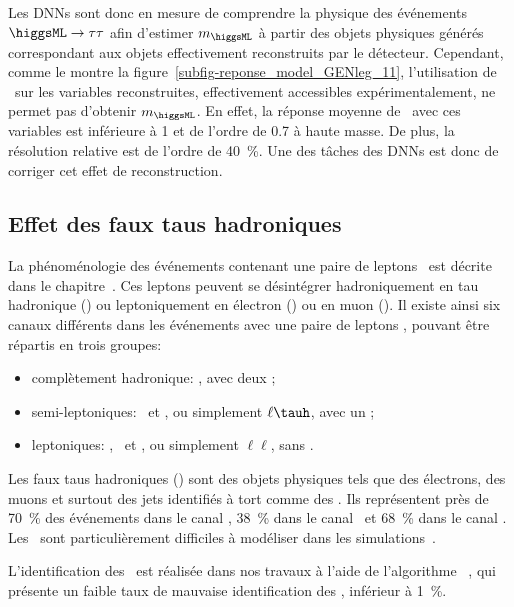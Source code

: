 \par
Les DNNs sont donc en mesure
de comprendre la physique des événements $\higgsML\to\tau\tau$
afin d'estimer $m_{\higgsML}$
à partir des objets physiques générés
correspondant aux objets effectivement reconstruits par le détecteur.
Cependant, comme le montre la figure~\ref{subfig-reponse_model_GENleg_11},
l'utilisation de \Bgenleg\ sur les variables reconstruites, effectivement accessibles expérimentalement, ne permet pas d'obtenir $m_{\higgsML}$.
En effet, la réponse moyenne de \Bgenleg\ avec ces variables est inférieure à \num{1} et de l'ordre de \num{0.7} à haute masse.
De plus, la résolution relative est de l'ordre de \SI{40}{\%}.
Une des tâches des DNNs est donc de corriger cet effet de reconstruction.
\subsection{Effet des faux taus hadroniques}
La phénoménologie des événements contenant une paire de leptons \tau\ est décrite dans le chapitre~.
Ces leptons peuvent se désintégrer hadroniquement en tau hadronique (\tauh) ou leptoniquement en électron (\ele) ou en muon (\mu).
Il existe ainsi six canaux différents dans les événements avec une paire de leptons \tau, pouvant être répartis en trois groupes:
\begin{itemize}
\item complètement hadronique: \tauh\tauh, avec deux \tauh;
\item semi-leptoniques: \mu\tauh\ et \ele\tauh, ou simplement $\ell\tauh$, avec un \tauh;
\item leptoniques: \mu\mu, \ele\mu\ et \ele\ele, ou simplement $\ell\ell$, sans \tauh.
\end{itemize}
\par
Les faux taus hadroniques (\ftauhs) sont des objets physiques tels que des électrons, des muons et surtout des jets identifiés à tort comme des \tauh.
Ils représentent près de \SI{70}{\%} des événements dans le canal \tauh\tauh, \SI{38}{\%} dans le canal \mu\tauh\ et \SI{68}{\%} dans le canal \ele\tauh.
Les \ftauhs\ sont particulièrement difficiles à modéliser dans les simulations~\cite{CMS-NOTE-2018-257,CMS-NOTE-2019-170}.
\par
L'identification des \tauh\ est réalisée dans nos travaux à l'aide de l'algorithme \DEEPTAU~\cite{CMS-DP-2019-033},
qui présente un faible taux de mauvaise identification des \tauh, inférieur à \SI{1}{\%}.
